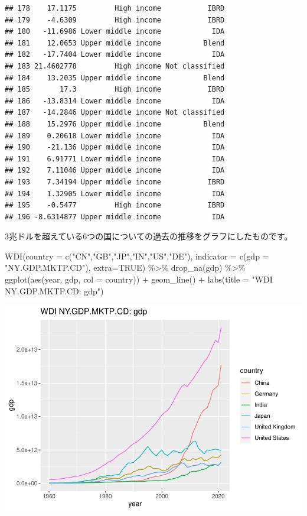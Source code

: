 \documentclass[
]{article}
\newenvironment{Shaded}{\begin{snugshade}}{\end{snugshade}}
\newcommand{\AttributeTok}[1]{\textcolor[rgb]{0.77,0.63,0.00}{#1}}
\newcommand{\ConstantTok}[1]{\textcolor[rgb]{0.00,0.00,0.00}{#1}}
\newcommand{\FunctionTok}[1]{\textcolor[rgb]{0.00,0.00,0.00}{#1}}
\newcommand{\NormalTok}[1]{#1}
\newcommand{\SpecialCharTok}[1]{\textcolor[rgb]{0.00,0.00,0.00}{#1}}
\newcommand{\StringTok}[1]{\textcolor[rgb]{0.31,0.60,0.02}{#1}}
\begin{document}
\begin{verbatim}
## 178    17.1175         High income           IBRD
## 179    -4.6309         High income           IBRD
## 180   -11.6986 Lower middle income            IDA
## 181    12.0653 Upper middle income          Blend
## 182   -17.7404 Lower middle income            IDA
## 183 21.4602778         High income Not classified
## 184    13.2035 Upper middle income          Blend
## 185       17.3         High income           IBRD
## 186   -13.8314 Lower middle income            IDA
## 187   -14.2846 Upper middle income Not classified
## 188    15.2976 Upper middle income          Blend
## 189    0.20618 Lower middle income            IDA
## 190    -21.136 Upper middle income            IDA
## 191    6.91771 Lower middle income            IDA
## 192    7.11046 Upper middle income            IDA
## 193    7.34194 Upper middle income           IBRD
## 194    1.32905 Lower middle income            IDA
## 195    -0.5477         High income           IBRD
## 196 -8.6314877 Upper middle income            IDA
\end{verbatim}

3兆ドルを超えている6つの国についての過去の推移をグラフにしたものです。

\begin{Shaded}
\begin{Highlighting}[]
\FunctionTok{WDI}\NormalTok{(}\AttributeTok{country =} \FunctionTok{c}\NormalTok{(}\StringTok{"CN"}\NormalTok{,}\StringTok{"GB"}\NormalTok{,}\StringTok{"JP"}\NormalTok{,}\StringTok{"IN"}\NormalTok{,}\StringTok{"US"}\NormalTok{,}\StringTok{"DE"}\NormalTok{), }\AttributeTok{indicator =} \FunctionTok{c}\NormalTok{(}\AttributeTok{gdp =} \StringTok{"NY.GDP.MKTP.CD"}\NormalTok{), }\AttributeTok{extra=}\ConstantTok{TRUE}\NormalTok{) }\SpecialCharTok{\%\textgreater{}\%} \FunctionTok{drop\_na}\NormalTok{(gdp) }\SpecialCharTok{\%\textgreater{}\%} 
  \FunctionTok{ggplot}\NormalTok{(}\FunctionTok{aes}\NormalTok{(year, gdp, }\AttributeTok{col =}\NormalTok{ country)) }\SpecialCharTok{+} \FunctionTok{geom\_line}\NormalTok{() }\SpecialCharTok{+}
  \FunctionTok{labs}\NormalTok{(}\AttributeTok{title =} \StringTok{"WDI NY.GDP.MKTP.CD: gdp"}\NormalTok{)}
\end{Highlighting}
\end{Shaded}

\includegraphics{intro2rj-short_files/figure-latex/unnamed-chunk-10-1.pdf}
\end{document}
